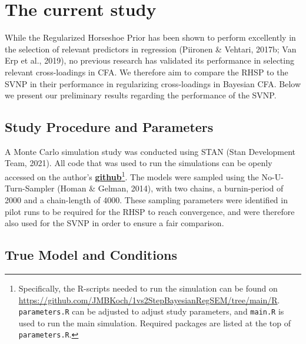 \documentclass[
  man,floatsintext]{apa6}
\begin{document}
\hypertarget{the-current-study}{%
\section{The current study}\label{the-current-study}}

While the Regularized Horseshoe Prior has been shown to perform excellently in the selection of relevant predictors in regression (Piironen \& Vehtari, 2017b; Van Erp et al., 2019), no previous research has validated its performance in selecting relevant cross-loadings in CFA. We therefore aim to compare the RHSP to the SVNP in their performance in regularizing cross-loadings in Bayesian CFA. Below we present our preliminary results regarding the performance of the SVNP.

\hypertarget{study-procedure-and-parameters}{%
\subsection{Study Procedure and Parameters}\label{study-procedure-and-parameters}}

A Monte Carlo simulation study was conducted using STAN (Stan Development Team, 2021). All code that was used to run the simulations can be openly accessed on the author's \href{https://github.com/JMBKoch/1vs2StepBayesianRegSEM}{\textbf{github}}\footnote{Specifically, the R-scripts needed to run the simulation can be found on \url{https://github.com/JMBKoch/1vs2StepBayesianRegSEM/tree/main/R}. \texttt{parameters.R} can be adjusted to adjust study parameters, and \texttt{main.R} is used to run the main simulation. Required packages are listed at the top of \texttt{parameters.R}.}. The models were sampled using the No-U-Turn-Sampler (Homan \& Gelman, 2014), with two chains, a burnin-period of 2000 and a chain-length of 4000. These sampling parameters were identified in pilot runs to be required for the RHSP to reach convergence, and were therefore also used for the SVNP in order to ensure a fair comparison.

\hypertarget{true-model-and-conditions}{%
\subsection{True Model and Conditions}\label{true-model-and-conditions}}
\end{document}
